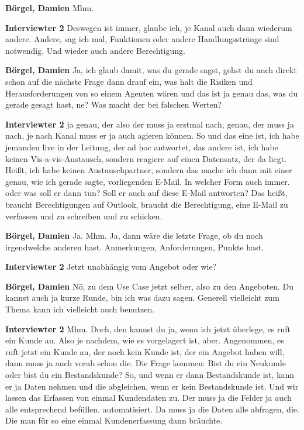 \textbf{Börgel, Damien}\newline
Mhm.

\textbf{Interviewter 2}\newline
Deswegen ist immer, glaube ich, je Kanal auch dann wiederum andere.
Andere, sag ich mal, Funktionen oder andere Handlungsstränge sind notwendig.
Und wieder auch andere Berechtigung.

\textbf{Börgel, Damien}\newline
Ja, ich glaub damit, was du gerade sagst, gehst du auch direkt schon auf die nächste Frage dann drauf ein, was halt die Risiken und Herausforderungen von so einem Agenten wären und das ist ja genau das, was du gerade gesagt hast, ne? Was macht der bei falschen Werten?

\textbf{Interviewter 2}\newline
ja genau, der also der muss ja erstmal nach, genau, der muss ja nach, je nach Kanal muss er ja auch agieren können. So und das eine ist, ich habe jemanden live in der Leitung, der ad hoc antwortet, das andere ist, ich habe keinen Vis-a-vis-Austausch, sondern reagiere auf einen Datensatz, der da liegt.
Heißt, ich habe keinen Austauschpartner, sondern das mache ich dann mit einer genau, wie ich gerade sagte, vorliegenden E-Mail. In welcher Form auch immer.
oder was soll er dann tun? Soll er auch auf diese E-Mail antworten? Das heißt, braucht Berechtigungen auf Outlook, braucht die Berechtigung, eine E-Mail zu verfassen und zu schreiben und zu schicken.

\textbf{Börgel, Damien}\newline
Ja.
Mhm.
Ja, dann wäre die letzte Frage, ob du noch irgendwelche anderen hast.
Anmerkungen, Anforderungen, Punkte hast.

\textbf{Interviewter 2}\newline
Jetzt unabhängig vom Angebot oder wie?

\textbf{Börgel, Damien}\newline
Nö, zu dem Use Case jetzt selber, also zu den Angeboten.
Du kannst auch ja kurze Runde, bin ich was dazu sagen. Generell vielleicht zum Thema kann ich vielleicht auch benutzen.

\textbf{Interviewter 2}\newline
Mhm.
Doch, den kannst du ja, wenn ich jetzt überlege, es ruft ein Kunde an.
Also je nachdem, wie es vorgelagert ist, aber. Angenommen, es ruft jetzt ein Kunde an, der noch kein Kunde ist, der ein Angebot haben will, dann muss ja auch vorab schon die.
Die Frage kommen: Bist du ein Neukunde oder bist du ein Bestandskunde?
So, und wenn er dann Bestandskunde ist, kann er ja Daten nehmen und die abgleichen, wenn er kein Bestandskunde ist. Und wir lassen das Erfassen von einmal Kundendaten zu. Der muss ja die Felder ja auch alle entsprechend befüllen.
automatisiert.
Da muss ja die Daten alle abfragen, die.
Die man für so eine einmal Kundenerfassung dann bräuchte.

